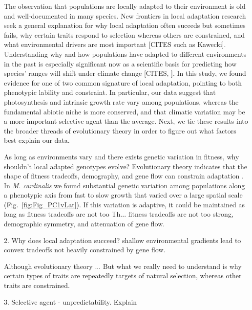 \documentclass[11pt, oneside]{article}\usepackage[]{graphicx}\usepackage[]{color}
\begin{document}
The observation that populations are locally adapted to their environment is old and well-documented in many species. New frontiers in local adaptation research seek a general explanation for why local adaptation often suceeds but sometimes fails, why certain traits respond to selection whereas others are constrained, and what environmental drivers are most important [CITES such as Kawecki]. Understanding why and how populations have adapted to different environments in the past is especially significant now as a scientific basis for predicting how species' ranges will shift under climate change [CITES, \citep{Catullo_etal_2015}]. In this study, we found evidence for one of two common signature of local adaptation, pointing to both phenotypic lability and constraint. In particular, our data suggest that photosynthesis and intrinsic growth rate vary among populations, whereas the fundamental abiotic niche is more conserved, and that climatic variation may be a more important selective agent than the average. Next, we tie these results into the broader threads of evolutionary theory in order to figure out what factors best explain our data.

As long as environments vary and there exists genetic variation in fitness, why shouldn't local adapted genotypes evolve? Evolutionary theory indicates that the shape of fitness tradeoffs, demography, and gene flow can constrain adaptation \citep{Levins_1968, Ronce_Kirkpatrick_2001}. In \textit{M. cardinalis} we found substantial genetic variation among populations along a phenotypic axis from fast to slow growth that varied over a large spatial scale (Fig.~\ref{fig:Fig_PC1vLat}). If this variation is adaptive, it could be maintained as long as fitness tradeoffs are not too Th... fitness tradeoffs are not too strong, demographic symmetry, and attenuation of gene flow.

2. Why does local adaptation succeed? shallow environmental gradients lead to convex tradeoffs not heavily constrained by gene flow.

Although evolutionary theory ... But what we really need to understand is why certain types of traits are repeatedly targets of natural selection, whereas other traits are constrained.

3. Selective agent - unpredictability. Explain
\end{document}
